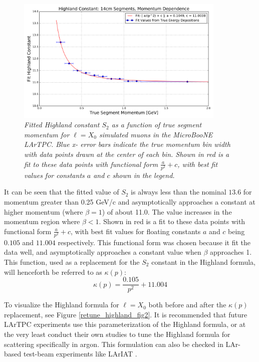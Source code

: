 \documentclass[a4paper,11pt]{article}
\begin{document}
\begin{figure}[ht!]
\begin{center}
\includegraphics[width=100mm]{Figures/highland_constant_optimization_momentumdependent.png}
\end{center}
\caption{\textit{Fitted Highland constant $S_2$ as a function of true segment momentum for ${\ell} = X_0$ simulated muons in the MicroBooNE LArTPC. Blue x- error bars indicate the true momentum bin width with data points drawn at the center of each bin. Shown in red is a fit to these data points with functional form $\frac{a}{p^2} + c$, with best fit values for constants $a$ and $c$ shown in the legend.}}
\label{retune_highland_fig1}
\end{figure}

It can be seen that the fitted value of $S_2$ is always less than the nominal $13.6$ for momentum greater than 0.25 GeV/c and asymptotically approaches a constant at higher momentum (where $\beta = 1$) of about 11.0. The value increases in the momentum region where $\beta < 1$. Shown in red is a fit to these data points with functional form $\frac{a}{p^2} + c$, with best fit values for floating constants $a$ and $c$ being $0.105$ and $11.004$ respectively. This functional form was chosen because it fit the data well, and asymptotically approaches a constant value when $\beta$ approaches 1. This function, used as a replacement for the $S_2$ constant in the Highland formula, will henceforth be referred to as $\kappa(p)$:
\begin{equation}\label{kappa_equation}
\kappa(p) = \frac{0.105}{p^2} + 11.004
\end{equation}

To visualize the Highland formula for ${\ell} = X_0$ both before and after the $\kappa(p)$ replacement, see Figure \ref{retune_highland_fig2}. It is recommended that future LArTPC experiments use this parameterization of the Highland formula, or at the very least conduct their own studies to tune the Highland formula for scattering specifically in argon. This formulation can also be checked in LAr-based test-beam experiments like LArIAT \cite{LARIAT_citation}.\\
\end{document}
